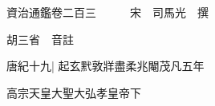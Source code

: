 






























































資治通鑑卷二百三　　　宋　司馬光　撰

胡三省　音註

唐紀十九|{
	起玄黓敦牂盡柔兆閹茂凡五年}


高宗天皇大聖大弘孝皇帝下


